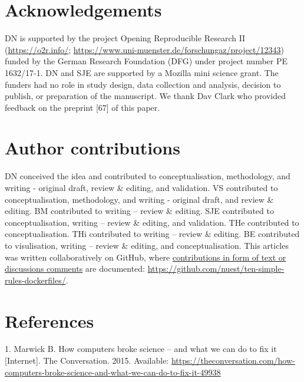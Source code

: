 \documentclass[10pt,letterpaper]{article}
\begin{document}
\hypertarget{acknowledgements}{%
\section*{Acknowledgements}\label{acknowledgements}}

DN is supported by the project Opening Reproducible Research II
(\href{https://o2r.info/}{https://o2r.info/};
\href{https://www.uni-muenster.de/forschungaz/project/12343}{https://www.uni-muenster.de/forschungaz/project/12343})
funded by the German Research Foundation (DFG) under project number PE
1632/17-1. DN and SJE are supported by a Mozilla mini science grant. The
funders had no role in study design, data collection and analysis,
decision to publish, or preparation of the manuscript. We thank Dav
Clark who provided feedback on the preprint {[}67{]} of this paper.

\hypertarget{contributions}{%
\section*{Author contributions}\label{contributions}}

DN conceived the idea and contributed to conceptualisation, methodology,
and writing - original draft, review \& editing, and validation. VS
contributed to conceptualisation, methodology, and writing - original
draft, and review \& editing. BM contributed to writing -- review \&
editing. SJE contributed to conceptualisation, writing -- review \&
editing, and validation. THe contributed to conceptualisation. THi
contributed to writing -- review \& editing. BE contributed to
visulisation, writing -- review \& editing, and conceptualisation. This
articles was written collaboratively on GitHub, where
\href{https://github.com/nuest/ten-simple-rules-dockerfiles/graphs/contributors}{contributions
in form of text or discussions comments} are documented:
\url{https://github.com/nuest/ten-simple-rules-dockerfiles/}.

\hypertarget{references}{%
\section*{References}\label{references}}

\hypertarget{refs}{}
\leavevmode\hypertarget{ref-marwick_how_2015}{}%
1. Marwick B. How computers broke science -- and what we can do to fix
it {[}Internet{]}. The Conversation. 2015. Available:
\url{https://theconversation.com/how-computers-broke-science-and-what-we-can-do-to-fix-it-49938}
\end{document}
